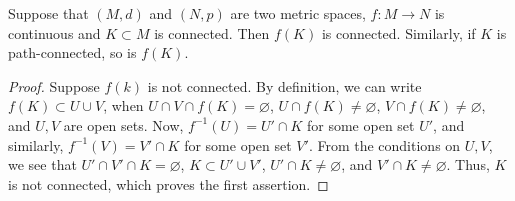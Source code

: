 \documentclass[../main-sheet.tex]{subfiles}
\begin{document}
\begin{thm}
    Suppose that $ (M,d) $ and $ (N,p) $ are two metric spaces, $ f:M\to N $ is continuous and $ K\subset M $ is connected. Then $ f(K) $ is connected. Similarly, if $ K $ is path-connected, so is $ f(K) $.
\end{thm}
\begin{proof}
    Suppose $ f(k) $ is not connected. By definition, we can write $ f(K)\subset U\cup V $, when $ U\cap V\cap f(K)=\varnothing $, $ U\cap f(K)\neq \varnothing $, $ V\cap f(K)\neq \varnothing $, and $ U,V $ are open sets. Now, $ f^{-1}(U)=U'\cap K $ for some open set $ U' $, and similarly, $ f^{-1}(V)=V'\cap K $ for some open set $ V' $. From the conditions on $ U, V $, we see that $ U'\cap V'\cap K=\varnothing $, $ K\subset U'\cup V' $, $ U'\cap K\neq \varnothing $, and $ V'\cap K\neq \varnothing $. Thus, $ K $ is not connected, which proves the first assertion.
\end{proof}
\end{document}
